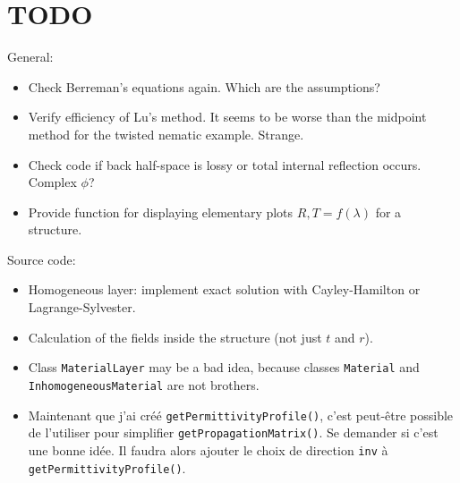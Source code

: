 \section{TODO}

General:
\begin{itemize}
\item Check Berreman's equations again. Which are the assumptions?
\item Verify efficiency of Lu's method. It seems to be worse than the midpoint method for the twisted nematic example. Strange.
\item Check code if back half-space is lossy or total internal reflection occurs. Complex $\phi$?
\item Provide function for displaying elementary plots $R,T=f(\lambda)$ for a structure.
\end{itemize}
%
Source code:
\begin{itemize}
\item Homogeneous layer: implement exact solution with Cayley-Hamilton or Lagrange-Sylvester.
\item Calculation of the fields inside the structure (not just $t$ and $r$).
\item Class \texttt{MaterialLayer} may be a bad idea, because classes \texttt{Material} and \texttt{InhomogeneousMaterial} are not brothers.
\item Maintenant que j'ai créé \texttt{getPermittivityProfile()}, c'est peut-être possible de l'utiliser pour simplifier \texttt{getPropagationMatrix()}. Se demander si c'est une bonne idée. Il faudra alors ajouter le choix de direction \texttt{inv} à \texttt{getPermittivityProfile()}.
\end{itemize}


